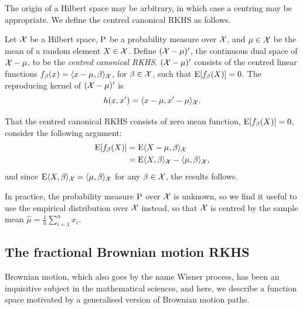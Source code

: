 The origin of a Hilbert space may be arbitrary, in which case a centring may be appropriate.
We define the centred canonical RKHS as follows.

\begin{definition}
  Let ${\mathcal X}$ be a Hilbert space, $\operatorname{P}$ be a probability measure over ${\mathcal X}$, and $\mu\in{\mathcal X}$ be the mean of a random element $X\in{\mathcal X}$. 
  Define $({\mathcal X} - \mu)'$, the continuous dual space of ${\mathcal X} - \mu$, to be the \emph{centred canonical RKHS}.
  $({\mathcal X} - \mu)'$ consists of the centred linear functions $f_\beta(x)=\langle x-\mu,\beta\rangle_{\mathcal X}$, for $\beta\in{\mathcal X}$, such that $\operatorname{E} [f_\beta(X)] = 0$.
  The reproducing kernel of $({\mathcal X} - \mu)'$ is
  \[
    h(x,x') = \langle x-\mu,x'-\mu\rangle_{\mathcal X}.
  \]
\end{definition}

That the centred canonical RKHS consists of zero mean function, $\operatorname{E} [f_\beta(X)] = 0$, consider the following argument:
\vspace{-0.5em}
\begin{align*}
  \E [f_\beta(X)] 
  &= \E \ip{X-\mu,\beta}_\cX \\
  &= \E \ip{X,\beta}_\cX - \ip{\mu,\beta}_\cX, \vspace{-0.5em}
\end{align*}
and since $\operatorname{E} \langle X,\beta\rangle_{\mathcal X} = \langle\mu,\beta\rangle_{\mathcal X}$ for any $\beta\in{\mathcal X}$, the results follows.

\begin{remark}\label{rem:empircent}
  In practice, the probability measure $\operatorname{P}$ over ${\mathcal X}$ is unknown, so we find it useful to use the empirical distribution over ${\mathcal X}$ instead, so that ${\mathcal X}$ is centred by the sample mean $\hat\mu = \frac{1}{n}\sum_{i=1}^n x_i$.  
\end{remark}

\subsection{The fractional Brownian motion RKHS}

Brownian motion, which also goes by the name Wiener process, has been an inquisitive subject in the mathematical sciences, and here, we describe a function space motivated by a generalised version of Brownian motion paths.

